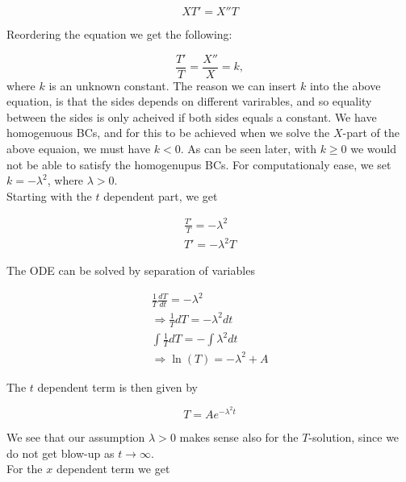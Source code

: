 \documentclass{article}
\begin{document}
\begin{equation}
XT'=X''T 
\end{equation}

Reordering the equation we get the following:

\begin{equation}
\frac{T'}{T} = \frac{X''}{X} = k,
\end{equation}
where $k$ is an unknown constant. The reason we can insert $k$ into the above equation, is that the sides depends on different varirables, and so equality between the sides is only acheived if both sides equals a constant. We have homogenuous BCs, and for this to be achieved when we solve the $X$-part of the above equaion, we must have $k <0$. As can be seen later, with $k\geq 0$ we would not be able to satisfy the homogenupus BCs. For computationaly ease, we set $k = -\lambda^2$, where $\lambda > 0$. \\

Starting with the $t$ dependent part, we get

\begin{eqnarray}
\frac{T'}{T} = -\lambda^2 \\ 
T' = -\lambda^2 T
\end{eqnarray}

The ODE can be solved by separation of variables

\begin{subequations}
	\begin{eqnarray}
	\label{eqn:solvingTdependentTransientTerm1D}
	\frac{1}{T}\frac{dT}{dt} = -\lambda^2 \\ 
	\Rightarrow \frac{1}{T} dT = -\lambda^2 dt\\
	\int \frac{1}{T}dT = - \int \lambda^2 dt \\
	\Rightarrow \ln(T) = -\lambda^2 + A
	\end{eqnarray}
\end{subequations}

The $t$ dependent term is then given by

\begin{equation}
T = Ae^{-\lambda^2 t}
\label{eqn:tdependentTransientTerm1D}
\end{equation}

We see that our assumption $\lambda > 0$ makes sense also for the $T$-solution, since we do not get blow-up as $t \rightarrow \infty$. \\

For the $x$ dependent term we get
\end{document}
